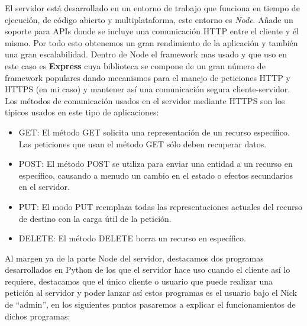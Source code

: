 \documentclass[a4paper, 12pt]{book}
\begin{document}
	El servidor está desarrollado en un entorno de trabajo que funciona en tiempo de ejecución, de código abierto y multiplataforma, este entorno es \textit{Node}. Añade un soporte para APIs donde se incluye una comunicación HTTP entre el cliente y él mismo. Por todo esto obtenemos un gran rendimiento de la aplicación y también una gran escalabilidad. Dentro de Node el framework mas usado y que uso en este caso es \textbf{Express} cuya biblioteca se compone de un gran número de framework populares dando mecanismos para el manejo de peticiones HTTP y HTTPS (en mi caso) y mantener así una comunicación segura cliente-servidor. 
	Los métodos de comunicación usados en el servidor mediante HTTPS son los típicos usados en este tipo de aplicaciones:
	\begin{itemize}
  	\item GET: El método GET  solicita una representación de un recurso específico. Las peticiones que usan el método GET sólo deben recuperar datos.
  	\item POST: El método POST se utiliza para enviar una entidad a un recurso en específico, causando a menudo un cambio en el estado o efectos secundarios en el servidor.
  	\item PUT: El modo PUT reemplaza todas las representaciones actuales del recurso de destino con la carga útil de la petición.
  	\item DELETE: El método DELETE borra un recurso en específico.
	\end{itemize}

Al margen ya de la parte Node del servidor, destacamos dos programas desarrollados en Python de los que el servidor hace uso cuando el cliente así lo requiere, destacamos que el único cliente o usuario que puede realizar una petición al servidor y poder lanzar así estos programas es el usuario bajo el Nick de ``admin'', en los siguientes puntos pasaremos a explicar el funcionamientos de dichos programas:
\end{document}
